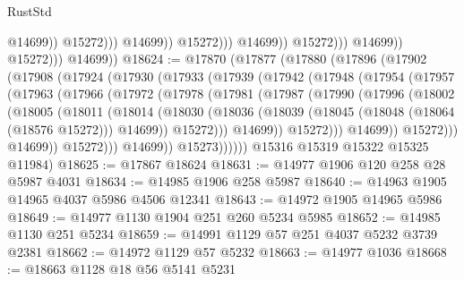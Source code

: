 \begin{lexlean}{RustStd}
\begin{coremodule}
                                                @14699))
                                            @15272)))
                                      @14699))
                                  @15272)))
                            @14699))
                        @15272)))
                  @14699))
              @15272)))
        @14699))
@18624 := @17870
    (@17877
      (@17880
        (@17896
          (@17902
            (@17908
              (@17924
                (@17930
                  (@17933
                    (@17939
                      (@17942
                        (@17948
                          (@17954
                            (@17957
                              (@17963
                                (@17966
                                  (@17972
                                    (@17978
                                      (@17981
                                        (@17987
                                          (@17990
                                            (@17996
                                              (@18002
                                                (@18005
                                                  (@18011
                                                    (@18014
                                                      (@18030
                                                        (@18036
                                                          (@18039
                                                            (@18045
                                                              (@18048 (@18064 (@18576 @15272)))
                                                              @14699))
                                                          @15272)))
                                                    @14699))
                                                @15272)))
                                          @14699))
                                      @15272)))
                                @14699))
                            @15272)))
                      @14699))
                  @15273))))))
      @15316
      @15319
      @15322
      @15325
      @11984)
@18625 := @17867 @18624
@18631 := @14977 @1906 @120 @258 @28 @5987 @4031
@18634 := @14985 @1906 @258 @5987
@18640 := @14963 @1905 @14965 @4037 @5986 @4506 @12341
@18643 := @14972 @1905 @14965 @5986
@18649 := @14977 @1130 @1904 @251 @260 @5234 @5985
@18652 := @14985 @1130 @251 @5234
@18659 := @14991 @1129 @57 @251 @4037 @5232 @3739 @2381
@18662 := @14972 @1129 @57 @5232
@18663 := @14977 @1036
@18668 := @18663 @1128 @18 @56 @5141 @5231

\end{coremodule}
\end{lexlean}

